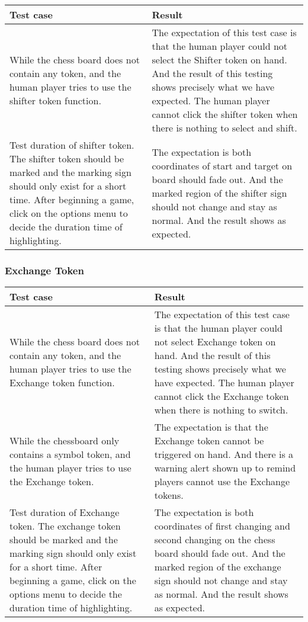\begin{table}[h]
	\centering
	\begin{tabular}{p{7cm}@{\hskip 5mm}  p{7cm}} 
		\toprule
		Test case   & Result   \\ 
		\midrule
		\midrule
		While the chess board does not contain any token, and the human player tries to use the shifter token function. & The expectation of this test case is that the human player could not select the Shifter token on hand. And the result of this testing shows precisely what we have expected. The human player cannot click the shifter token when there is nothing to select and shift.  \\ 
		\midrule
		Test duration of shifter token. The shifter token should be marked and the marking sign should only exist for a short time. After beginning a game, click on the options menu to decide the duration time of highlighting. & The expectation is both coordinates of start and target on board should fade out. And the marked region of the shifter sign should not change and stay as normal. And the result shows as expected. \\
		\bottomrule
	\end{tabular}
\end{table}

\newpage
\subsubsection{Exchange Token}

\begin{table}[h]
	\centering
	\begin{tabular}{p{7cm}@{\hskip 5mm}  p{7cm}} 
		\toprule
		Test case   & Result   \\ 
		\midrule
		\midrule
		While the chess board does not contain any token, and the human player tries to use the Exchange token function. & The expectation of this test case is that the human player could not select Exchange token on hand. And the result of this testing shows precisely what we have expected. The human player cannot click the Exchange token when there is nothing to switch.  \\ 
		\midrule
		While the chessboard only contains a symbol token, and the human player tries to use the Exchange token. & The expectation is that the Exchange token cannot be triggered on hand.  And there is a warning alert shown up to remind players cannot use the Exchange tokens.\\
		\midrule
		Test duration of Exchange token. The exchange token should be marked and the marking sign should only exist for a short time. After beginning a game, click on the options menu to decide the duration time of highlighting. & The expectation is both coordinates of first changing and second changing on the chess board should fade out. And the marked region of the exchange sign should not change and stay as normal. And the result shows as expected. \\
		\bottomrule
	\end{tabular}
\end{table}

